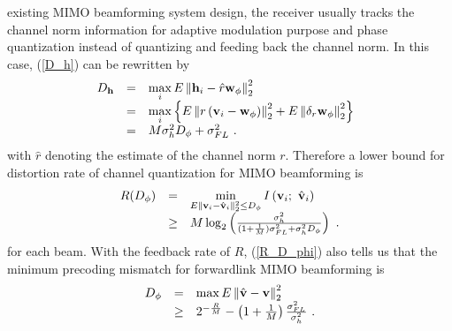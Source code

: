 \documentclass[10pt,fleqn, twocolumn]{IEEEtran}
\newcommand{\bh}{{\bf h}}
\newcommand{\bv}{{\bf v}}
\newcommand{\bw}{{\bf w}}
\begin{document}
existing MIMO beamforming system design, the receiver usually
tracks the channel norm information for adaptive modulation
purpose and phase quantization instead of quantizing and feeding
back the channel norm. In this case, (\ref{D_h}) can be rewritten
by
\begin{equation}\hspace{-0.10in}
\begin{array}{rcl}
D_{\bh}&=&\max\limits_{i}\mbox{E}\left\|\bh_{i}-\hat{r}{\bw}_{\phi}\right\|_{2}^{2}\\
&=&\max\limits_{i}\left\{\mbox{E}\left\|r\left(\bv_{i}-{\bw}_{\phi}\right)\right\|_{2}^{2}+\mbox{E}\left\|\delta_{r}{\bw}_{\phi}\right\|_{2}^{2}\right\}\\
&=&M\sigma_{h}^{2}D_{\phi}+\sigma_{\mbox{\tiny FL}}^{2}\ .
\end{array}\label{D_h2}
\end{equation}
\noindent with $\hat{r}$ denoting the estimate of the channel norm
$r$. Therefore a lower bound for distortion rate of channel
quantization for MIMO beamforming is
\begin{equation}%
\begin{array}{rcl}
R(D_{\phi})&=&\min\limits_{E\|\bv_{i}-\hat{\bv}_{i}\|_{2}^{2}\leq
D_{\phi}} I\left(\bv_{i};\
\hat{\bv}_{i}\right)\\
&\geq&M\log_{2}\left(\frac{\sigma_{h}^{2}}{(1+\frac{1}{M})\sigma_{\mbox{\tiny
FL}}^{2}+\sigma_{h}^{2}D_{\phi}}\right)\ .
\end{array}\label{R_D_phi}
\end{equation}
\noindent for each beam. With the feedback rate of $R$,
(\ref{R_D_phi}) also tells us that the minimum precoding mismatch
for forwardlink MIMO beamforming is
\begin{equation}%
\begin{array}{rcl}
D_{\phi}&=&\max\mbox{E}\left\|\hat{\bv}-\bv\right\|_{2}^{2}\\
 &\geq&2^{-\frac{R}{M}}-\left(1+\frac{1}{M}\right)\frac{\sigma_{\mbox{\tiny
FL}}^{2}}{\sigma_{h}^{2}}\ .
\end{array}\label{D_phi}
\end{equation}
\end{document}
